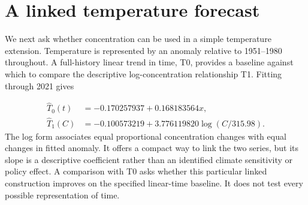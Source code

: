 \documentclass[11pt,a4paper]{article}
\newcommand{\p}[2]{#2\par}
\begin{document}
\section{A linked temperature forecast}\label{sec:temperature}
\p{TEM01}{We next ask whether concentration can be used in a simple temperature extension. Temperature is represented by an anomaly relative to 1951--1980 throughout. A full-history linear trend in time, T0, provides a baseline against which to compare the descriptive log-concentration relationship T1. Fitting through 2021 gives}
\begin{align}
\widehat T_0(t)&=-0.170257937+0.168183564x,\label{eq:t0}\\
\widehat T_1(C)&=-0.100573219+3.776119820\log(C/315.98).\label{eq:t1}
\end{align}
\p{TEM02}{The log form associates equal proportional concentration changes with equal changes in fitted anomaly. It offers a compact way to link the two series, but its slope is a descriptive coefficient rather than an identified climate sensitivity or policy effect. A comparison with T0 asks whether this particular linked construction improves on the specified linear-time baseline. It does not test every possible representation of time.}
\end{document}
